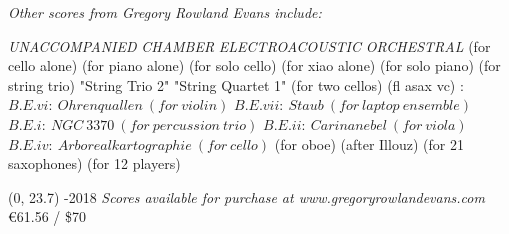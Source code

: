 \documentclass[10pt]{article}
\begin{document}

\vspace*{4\baselineskip}
\begin{center}
\textit{\fontsize{.7cm}{1em}\selectfont Other scores from Gregory Rowland Evans include:} \hfill
\end{center}
\vspace*{6\baselineskip}
{
\begin{center}
\setlength{\columnseprule}{1pt}
\setlength{\columnsep}{6em}

\begin{paracol}{4}
\textit{\fontsize{.4cm}{1em}\selectfont UNACCOMPANIED}
\switchcolumn[1]
\textit{\fontsize{.4cm}{1em}\selectfont CHAMBER}
\switchcolumn[2]
\textit{\fontsize{.4cm}{1em}\selectfont ELECTROACOUSTIC}
\switchcolumn[3]
\textit{\fontsize{.4cm}{1em}\selectfont ORCHESTRAL}
\switchcolumn[0]
\fontsize{.1cm}{0.5em}  (for cello alone)
\switchcolumn[0]
\fontsize{.1cm}{0.5em}  (for piano alone)
\switchcolumn[0]
\fontsize{.1cm}{0.5em}  (for solo cello)
 \switchcolumn[0]
\fontsize{.1cm}{0.5em}  (for xiao alone)
  \switchcolumn[0]
\fontsize{.1cm}{0.5em}  (for solo piano)
\switchcolumn[1]
\fontsize{.1cm}{0.5em} 
\switchcolumn[1]
\fontsize{.1cm}{0.5em} 
\switchcolumn[1]
\fontsize{.1cm}{0.5em}  (for string trio)
\switchcolumn[1]
\fontsize{.1cm}{0.5em}  "String Trio 2"
\switchcolumn[1]
\fontsize{.1cm}{0.5em}  "String Quartet 1"
\switchcolumn[1]
\fontsize{.1cm}{0.5em}  (for two cellos)
\switchcolumn[1]
\fontsize{.1cm}{0.5em}  (fl asax vc)
\switchcolumn[2]
\fontsize{.1cm}{0.5em} :
\switchcolumn[2]
\fontsize{.05cm}{0.5em} $B.E.vi: \ Ohrenquallen \ (for \ violin)$
\switchcolumn[2]
\fontsize{.05cm}{0.5em} $B.E.vii: \ Staub \ (for \ laptop \ ensemble)$
\switchcolumn[2]
\fontsize{.05cm}{0.5em} $B.E.i: \ NGC \ 3370 \ (for \ percussion \ trio)$
\switchcolumn[2]
\fontsize{.05cm}{0.5em} $B.E.ii: \ Carinanebel \ (for \ viola)$
\switchcolumn[2]
\fontsize{.05cm}{0.5em} $B.E.iv: \ Arborealkartographie \ (for \ cello)$
\switchcolumn[2]
\fontsize{.1cm}{0.5em}  (for oboe)
\switchcolumn[3]
\fontsize{.1cm}{0.5em} 
\switchcolumn[3]
\fontsize{.1cm}{0.5em}  (after Illouz)
\switchcolumn[3]
\fontsize{.1cm}{0.5em}  (for 21 saxophones)
\switchcolumn[3]
\fontsize{.1cm}{0.5em}  (for 12 players)


\end{paracol}
\end{center}
}

\begin{textblock}{23}(0, 23.7)
-2018 \hfill
\textit{Scores available for purchase at www.gregoryrowlandevans.com} \hfill
\euro 61.56 / \$70
\end{textblock}
\end{document}
